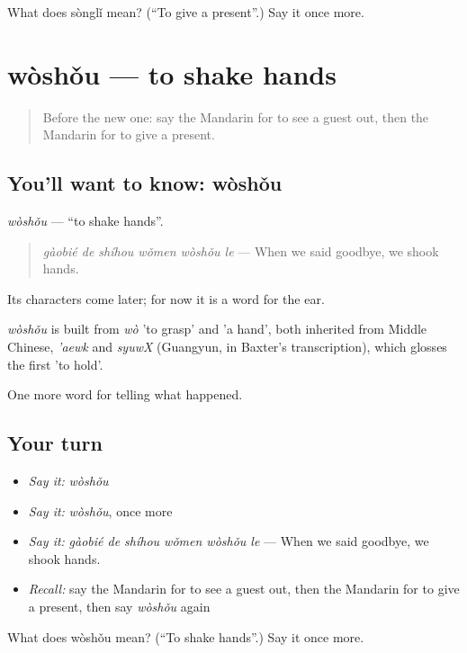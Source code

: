 \begin{tcolorbox}[breakable,colback=teal!4,colframe=teal!35!black,title={Before you move on}]
What does sònglǐ mean? (\textquotedblleft{}To give a present\textquotedblright{}.) Say it once more.
\end{tcolorbox}
\section[wòshǒu]{wòshǒu — to shake hands}

\label{lesson:ZH-C336-woshou}



\begin{quote}
Before the new one: say the Mandarin for to see a guest out, then the Mandarin for to give a present.
\end{quote}

\subsection*{You'll want to know: wòshǒu}
\emph{wòshǒu} — \textquotedblleft{}to shake hands\textquotedblright{}.

\begin{quote}
\emph{gàobié de shíhou wǒmen wòshǒu le} — When we said goodbye, we shook hands.
\end{quote}

Its characters come later; for now it is a word for the ear.

\begin{cousinweb}
\emph{wòshǒu} is built from \emph{wò} 'to grasp' and  'a hand', both inherited from Middle Chinese, \emph{'aewk} and \emph{syuwX} (Guangyun, in Baxter's transcription), which glosses the first 'to hold'.
\end{cousinweb}

\begin{grammarlens}[title={What you've built}]
One more word for telling what happened.
\end{grammarlens}

\subsection*{Your turn}
\begin{itemize}
\raggedright
  \item \emph{Say it:} \emph{wòshǒu}
  \item \emph{Say it:} \emph{wòshǒu}, once more
  \item \emph{Say it:} \emph{gàobié de shíhou wǒmen wòshǒu le} — When we said goodbye, we shook hands.
  \item \emph{Recall:} say the Mandarin for to see a guest out, then the Mandarin for to give a present, then say \emph{wòshǒu} again
\end{itemize}

\begin{tcolorbox}[breakable,colback=teal!4,colframe=teal!35!black,title={Before you move on}]
What does wòshǒu mean? (\textquotedblleft{}To shake hands\textquotedblright{}.) Say it once more.
\end{tcolorbox}
